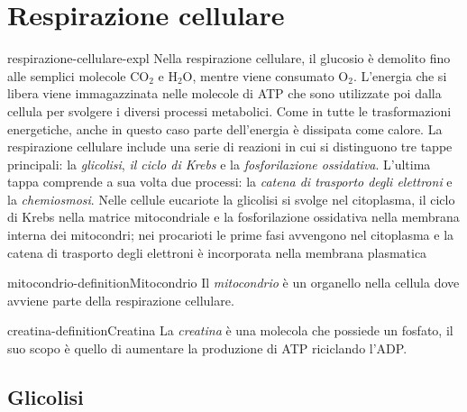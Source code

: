 \documentclass[preview]{standalone}
\begin{document}
\genpage

\section{Respirazione cellulare}

\begin{snippet}{respirazione-cellulare-expl}
    Nella respirazione cellulare, il glucosio è demolito fino alle semplici molecole CO\({}_2\) e H\({}_2\)O,
    mentre viene consumato O\({}_2\). L'energia che si libera viene immagazzinata nelle molecole di
    ATP che sono utilizzate poi dalla cellula per svolgere i diversi processi metabolici. Come in
    tutte le trasformazioni energetiche, anche in questo caso parte dell'energia è dissipata come
    calore. La respirazione cellulare include una serie di reazioni in cui si distinguono tre tappe
    principali: la \textit{glicolisi}, \textit{il ciclo di Krebs} e la \textit{fosforilazione ossidativa}.
    L'ultima tappa comprende a sua volta due processi:
    la \textit{catena di trasporto degli elettroni} e la \textit{chemiosmosi}. Nelle cellule
    eucariote la glicolisi si svolge nel citoplasma, il ciclo di Krebs nella matrice mitocondriale e
    la fosforilazione ossidativa nella membrana interna dei mitocondri; nei procarioti le prime
    fasi avvengono nel citoplasma e la catena di trasporto degli elettroni è incorporata nella
    membrana plasmatica
\end{snippet}


\begin{snippetdefinition}{mitocondrio-definition}{Mitocondrio}
    Il \textit{mitocondrio} è un organello nella cellula dove avviene parte della respirazione cellulare.
\end{snippetdefinition}


\begin{snippetdefinition}{creatina-definition}{Creatina}
    La \textit{creatina} è una molecola che possiede un fosfato, il suo scopo è quello di aumentare la produzione di ATP riciclando l'ADP.
\end{snippetdefinition}

\subsection{Glicolisi}
\end{document}
